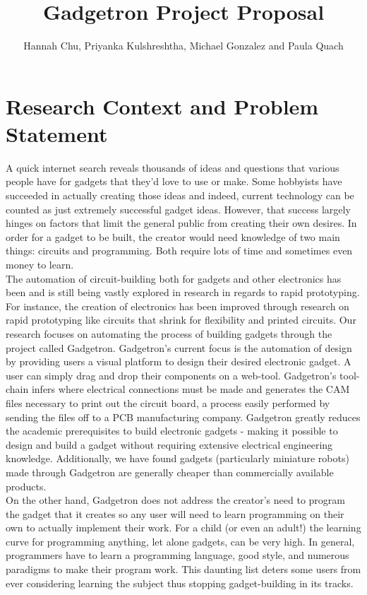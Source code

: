 \documentclass[12pt]{article}
\begin{document}
\author{Hannah Chu, Priyanka Kulshreshtha, Michael Gonzalez and Paula Quach}
\title{Gadgetron Project Proposal}
\maketitle

\section{Research Context and Problem Statement}
A quick internet search reveals thousands of ideas and questions that various people have for gadgets that they'd love to use or make. Some hobbyists have succeeded in actually creating those ideas and indeed, current technology can be counted as just extremely successful gadget ideas. However, that success largely hinges on factors that limit the general public from creating their own desires. In order for a gadget to be built, the creator would need knowledge of two main things: circuits and programming. Both require lots of time and sometimes even money to learn.\\[7pt]
The automation of circuit-building both for gadgets and other electronics has been and is still being vastly explored in research in regards to rapid prototyping. For instance, the creation of electronics has been improved through research on rapid prototyping like circuits that shrink for flexibility\cite{shrinky} and printed circuits\cite{inkjets}. Our research focuses on automating the process of building gadgets through the project called Gadgetron. Gadgetron's current focus is the automation of design by providing users a visual platform to design their desired electronic gadget. A user can simply drag and drop their components on a web-tool. Gadgetron's tool-chain infers where electrical connections must be made and generates the CAM files necessary to print out the circuit board, a process easily performed by sending the files off to a PCB manufacturing company. Gadgetron greatly reduces the academic prerequisites to build electronic gadgets - making it possible to design and build a gadget without requiring extensive electrical engineering knowledge. Additionally, we have found gadgets (particularly miniature robots) made through Gadgetron are generally cheaper than commercially available products.\\[7pt]
On the other hand, Gadgetron does not address the creator's need to program the gadget that it creates so any user will need to learn programming on their own to actually implement their work. For a child (or even an adult!) the learning curve for programming anything, let alone gadgets, can be very high. In general, programmers have to learn a programming language, good style, and numerous paradigms to make their program work. This daunting list deters some users from ever considering learning the subject thus stopping gadget-building in its tracks. 
\end{document}
